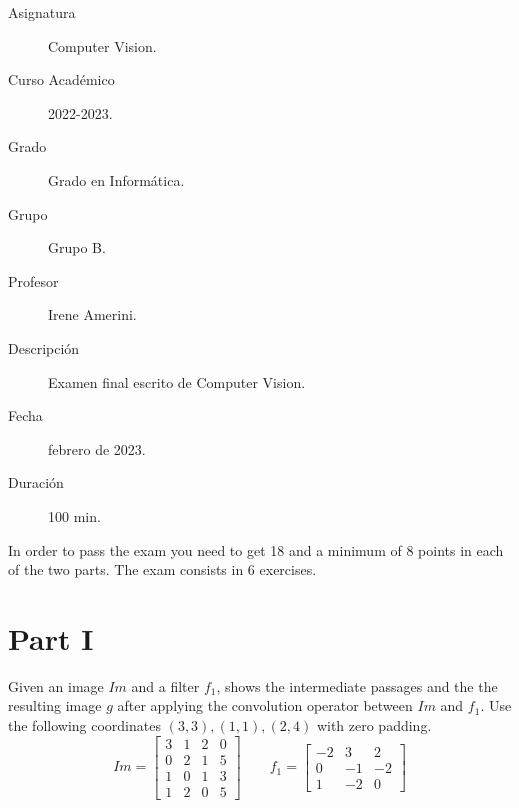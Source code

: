 \documentclass[12pt]{article}
\begin{document}

    
	

    \begin{description}
        \item[Asignatura] Computer Vision.
        \item[Curso Académico] 2022-2023.
        \item[Grado] Grado en Informática.
        \item[Grupo] Grupo B.
        \item[Profesor] Irene Amerini.
        \item[Descripción] Examen final escrito de Computer Vision.
        \item[Fecha] febrero de 2023.
        \item[Duración] 100 min.
    
    \end{description}
    \newpage


    \begin{observacion}
        In order to pass the exam you need to get 18 and a minimum of 8 points in each of the two parts. The exam consists in 6 exercises.
    \end{observacion}

    \section{Part I}

    \begin{ejercicio}[4 points]
        Given an image $Im$ and a filter $f_1$, shows the intermediate passages and the the resulting image $g$ after applying the convolution operator between $Im$ and $f_1$. Use the following coordinates $(3,3),(1,1),(2,4)$ with zero padding.
        \[
        Im = \begin{bmatrix}
            3 & 1 & 2 & 0 \\
            0 & 2 & 1 & 5 \\
            1 & 0 & 1 & 3 \\
            1 & 2 & 0 & 5
        \end{bmatrix} \qquad
        f_1 = \begin{bmatrix}
            -2 & 3 & 2 \\
            0 & -1 & -2 \\
            1 & -2 & 0
        \end{bmatrix}
        \]
    \end{ejercicio}
\end{document}
